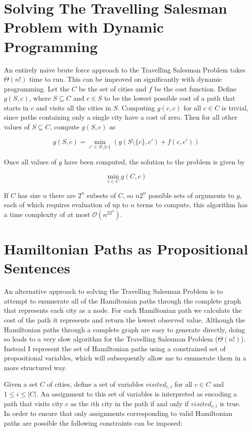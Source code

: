 \documentclass[12pt,a4paper,twoside,openright]{report}
\begin{document}
\section{Solving The Travelling Salesman Problem with Dynamic Programming} \label{dynamicprogramming}
An entirely naive brute force approach to the Travelling Salesman Problem takes $\Theta(n!)$ time to run. This can be improved on significantly with dynamic programming\cite{advancedalgos}. Let the $C$ be the set of cities and $f$ be the cost function. Define $g(S, c)$, where $S\subseteq C$ and $c\in S$ to be the lowest possible cost of a path that starts in $c$ and visits all the cities in $S$. Computing $g({c}, c)$ for all $c\in C$ is trivial, since paths containing only a single city have a cost of zero. Then for all other values of $S\subseteq C$, compute $g(S,c)$ as 

$$
g(S,c)=\min_{c'\in S\setminus\{c\}}(g(S\setminus\{c\},c') + f(c,c'))
$$

Once all values of $g$ have been computed, the solution to the problem is given by

$$
\min_{c\in C} g(C,c)
$$

If $C$ has size $n$ there are $2^n$ subsets of $C$, so $n2^n$ possible sets of arguments to $g$, each of which requires evaluation of up to $n$ terms to compute, this algorithm has a time complexity of at most $\mathcal{O}(n^22^n)$.

\section{Hamiltonian Paths as Propositional Sentences} \label{hamiltonianpath}
An alternative approach to solving the Travelling Salesman Problem is to attempt to enumerate all of the Hamiltonian paths through the complete graph that represents each city as a node. For each Hamiltonian path we calculate the cost of the path it represents and return the lowest observed value. Although the Hamiltonian paths through a complete graph are easy to generate directly, doing so leads to a very slow algorithm for the Travelling Salesman Problem ($\Theta(n!)$). Instead I represent the set of Hamiltonian paths using a constrained set of propositional variables, which will subsequently allow me to enumerate them in a more structured way.

Given a set $C$ of cities, define a set of variables $visited_{c,i}$ for all $c\in C$ and $1\leq i\leq|C|$. An assignment to this set of variables is interpreted as encoding a path that visits city $c$ as the $i$th city in the path if and only if $visited_{c,i}$ is true. In order to ensure that only assignments corresponding to valid Hamiltonian paths are possible the following constraints can be imposed:
\end{document}
